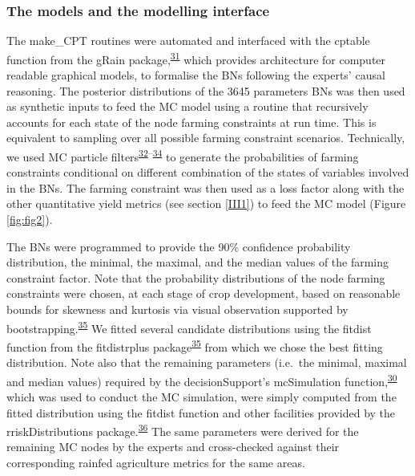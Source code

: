 \documentclass[12pt,oneside]{article}
\begin{document}
\hypertarget{III32}{%
\subsubsection{The models and the modelling interface}\label{III32}}

The make\_CPT routines were automated and interfaced with the cptable function from the gRain package,\textsuperscript{\protect\hyperlink{ref-Hojsgaard_2012}{31}} which provides architecture for computer readable graphical models, to formalise the BNs following the experts' causal reasoning. The posterior distributions of the 3645 parameters BNs was then used as synthetic inputs to feed the MC model using a routine that recursively accounts for each state of the node farming constraints at run time. This is equivalent to sampling over all possible farming constraint scenarios. Technically, we used MC particle filters\textsuperscript{\protect\hyperlink{ref-Kitagawa_2016}{32}--\protect\hyperlink{ref-Scutari_2010}{34}} to generate the probabilities of farming constraints conditional on different combination of the states of variables involved in the BNs. The farming constraint was then used as a loss factor along with the other quantitative yield metrics (see section \ref{III1}) to feed the MC model (Figure \ref{fig:fig2}).

The BNs were programmed to provide the 90\% confidence probability distribution, the minimal, the maximal, and the median values of the farming constraint factor. Note that the probability distributions of the node farming constraints were chosen, at each stage of crop development, based on reasonable bounds for skewness and kurtosis via visual observation supported by bootstrapping.\textsuperscript{\protect\hyperlink{ref-Delignette-Muller_and_Dutang_2015}{35}} We fitted several candidate distributions using the fitdist function from the fitdistrplus package\textsuperscript{\protect\hyperlink{ref-Delignette-Muller_and_Dutang_2015}{35}} from which we chose the best fitting distribution. Note also that the remaining parameters (i.e.~the minimal, maximal and median values) required by the decisionSupport's mcSimulation function,\textsuperscript{\protect\hyperlink{ref-Luedeling_and_Goehring_2018}{30}} which was used to conduct the MC simulation, were simply computed from the fitted distribution using the fitdist function and other facilities provided by the rriskDistributions package.\textsuperscript{\protect\hyperlink{ref-Belgorodski_et_al_2017}{36}} The same parameters were derived for the remaining MC nodes by the experts and cross-checked against their corresponding rainfed agriculture metrics for the same areas.
\end{document}
